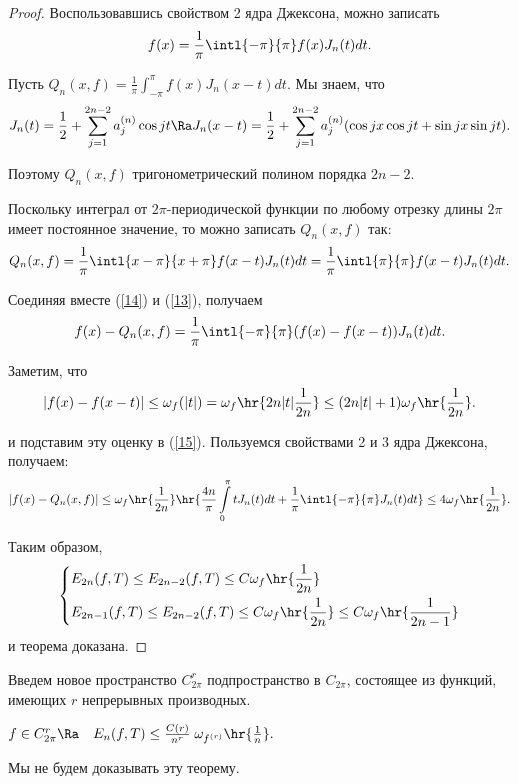 \documentclass{article}
\begin{document}
\begin{proof}
  Воспользовавшись свойством 2 ядра
  Джексона, можно записать
  \begin{equation}\label{14}
    f(x)=\frac1{\pi}\intl{-\pi}{\pi}f(x)J_n(t)dt.
  \end{equation}

  Пусть $Q_n(x,f)=\frac1{\pi}\int_{-\pi}^{\pi}f(x)J_n(x-t)dt.$ Мы
  знаем, что
  $$J_n(t)=\frac12+\sum_{j=1}^{2n-2}a_j^{(n)}\cos jt\Ra
  J_n(x-t)=\frac12+\sum_{j=1}^{2n-2}a_j^{(n)}(\cos jx\cos jt+\sin
  jx\sin jt).$$

  Поэтому $Q_n(x,f)$ тригонометрический полином порядка $2n-2.$

  Поскольку интеграл от $2\pi$-периодической функции по любому
  отрезку длины $2\pi$ имеет постоянное значение, то можно записать
  $Q_n(x,f)$ так:
  \begin{equation}\label{13}
    Q_n(x,f)=\frac1{\pi}\intl{x-\pi}{x+\pi}f(x-t)J_n(t)dt=\frac1{\pi}\intl{\pi}{\pi}f(x-t)J_n(t)dt.
  \end{equation}

  Соединяя вместе (\ref{14}) и (\ref{13}), получаем
  \begin{equation}\label{15}
    f(x)-Q_n(x,f)=\frac1{\pi}\intl{-\pi}{\pi}(f(x)-f(x-t))J_n(t)dt.
  \end{equation}

  Заметим, что
  \begin{equation*}
    |f(x)-f(x-t)|\le\omega_f(|t|)=\omega_f\hr{2n|t|\frac1{2n}}\le(2n|t|+1)\omega_f\hr{\frac1{2n}}.
  \end{equation*}

  и подставим эту оценку в (\ref{15}). Пользуемся свойствами 2 и 3
  ядра Джексона, получаем:
  \begin{equation*}
    |f(x)-Q_n(x,f)|\le\omega_f\hr{\frac1{2n}}\hr{\frac{4n}{\pi}\int\limits_0^{\pi}tJ_n(t)dt+\frac1{\pi}\intl{-\pi}{\pi}J_n(t)dt}\le4\omega_f\hr{\frac1{2n}}.
  \end{equation*}

  Таким образом,
  $$\left\{\begin{aligned}
  &E_{2n}(f,T)\le E_{2n-2}(f,T)\le C\omega_f\hr{\frac1{2n}}\\
  &E_{2n-1}(f,T)\le E_{2n-2}(f,T)\le
  C\omega_f\hr{\frac1{2n}}\le
  C\omega_f\hr{\frac1{2n-1}}
  \end{aligned}
  \right.
  $$
  и теорема доказана.
\end{proof}

Введем новое пространство $C_{2\pi}^r$ подпространство в
$C_{2\pi}$, состоящее из функций, имеющих $r$ непрерывных
производных.
\begin{theorem} $f\in
C_{2\pi}^r\Ra\quad E_n(f,T)\le
\frac{C(r)}{n^r}\;\omega_{f^{(r)}}\hr{\frac1n}.$
\end{theorem}
Мы не будем доказывать эту теорему.
\end{document}
